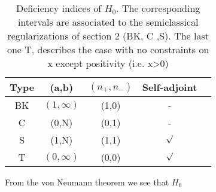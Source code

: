 \documentclass[12pt, letterpaper]{article}
\newcommand*{\1}{\hspace{1pt}}
\begin{document}
        \begin{longtable}[c]{c c c c c}
            \caption{Deficiency indices of $H_{0}$. The corresponding intervals are associated to the semiclassical regularizations of section 2 (BK, C ,S).
            The last one T, describes the case with no constraints on x except positivity (i.e. x>0)} \\
            \hline
             Type & (a,b) & $(n_{+}, n_{-})$ & Self-adjoint\\
             \hline 
             BK & $(1,\infty)$ & (1,0) & -\\  
             C & (0,N) & (0,1) &  -\\ 
             S & (1,N) & (1,1) & $\surd$ \\ 
             T & $(0,\infty)$ & (0,0) & $\surd $\\ 
            \hline
        \end{longtable}


        From the von Neumann theorem we see that $H_{0}$
    
    
\end{document}
